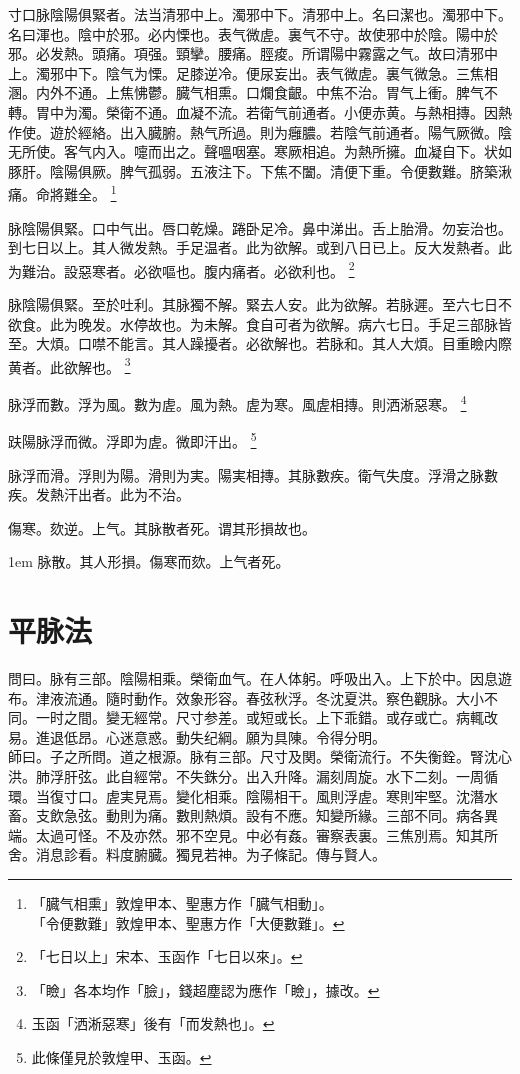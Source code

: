 寸口脉陰陽俱緊者。法当清邪中上。濁邪中下。清邪中上。名曰潔也。濁邪中下。名曰渾也。陰中於邪。必内慄也。表气微虗。裏气不守。故使邪中於陰。陽中於邪。必发熱。頭痛。項强。頸攣。腰痛。脛痠。所谓陽中霧露之气。故曰清邪中上。濁邪中下。陰气为慄。足膝逆冷。便尿妄出。表气微虗。裏气微急。三焦相溷。内外不通。上焦怫鬱。臓气相熏。口爛食齦。中焦不治。胃气上衝。脾气不轉。胃中为濁。榮衛不通。血凝不流。若衛气前通者。小便赤黄。与熱相摶。因熱作使。遊於經絡。出入臓腑。熱气所過。則为癰膿。若陰气前通者。陽气厥微。陰无所使。客气内入。嚏而出之。聲嗢咽塞。寒厥相追。为熱所擁。血凝自下。状如豚肝。陰陽俱厥。脾气孤弱。五液注下。下焦不闔。清便下重。令便數難。脐築湫痛。命將難全。
	\footnote{「臓气相熏」敦煌甲本、聖惠方作「臓气相動」。\\「令便數難」敦煌甲本、聖惠方作「大便數難」。}

脉陰陽俱緊。口中气出。唇口乾燥。踡卧足冷。鼻中涕出。舌上胎滑。勿妄治也。到七日以上。其人微发熱。手足温者。此为欲解。或到八日已上。反大发熱者。此为難治。設惡寒者。必欲嘔也。腹内痛者。必欲利也。
	\footnote{「七日以上」宋本、玉函作「七日以來」。}

脉陰陽俱緊。至於吐利。其脉獨不解。緊去人安。此为欲解。若脉遲。至六七日不欲食。此为晚发。水停故也。为未解。食自可者为欲解。病六七日。手足三部脉皆至。大煩。口噤不能言。其人躁擾者。必欲解也。若脉和。其人大煩。目重瞼内際黄者。此欲解也。
	\footnote{「瞼」各本均作「臉」，錢超塵認为應作「瞼」，據改。}

脉浮而數。浮为風。數为虗。風为熱。虗为寒。風虗相摶。則洒淅惡寒。
	\footnote{玉函「洒淅惡寒」後有「而发熱也」。}

趺陽脉浮而微。浮即为虗。微即汗出。
	\footnote{此條僅見於敦煌甲、玉函。}

脉浮而滑。浮{\khaaitp 則}为陽。滑{\khaaitp 則}为実。陽実相摶。其脉數疾。衛气失度。浮滑之脉數疾。发熱汗出者。此为不治。

傷寒。欬逆。上气。其脉散者死。谓其形損故也。

\hangindent 1em
脉散。其人形損。傷寒而欬。上气者死。

\chapter{平脉法}

問曰。脉有三部。陰陽相乘。榮衛血气。在人体躬。呼吸出入。上下於中。因息遊布。津液流通。隨时動作。效象形容。春弦秋浮。冬沈夏洪。察色觀脉。大小不同。一时之間。變无經常。尺寸参差。或短或长。上下乖錯。或存或亡。病輒改易。進退低昂。心迷意惑。動失纪綱。願为具陳。令得分明。\\
師曰。子之所問。道之根源。脉有三部。尺寸及関。榮衛流行。不失衡銓。腎沈心洪。肺浮肝弦。此自經常。不失銖分。出入升降。漏刻周旋。水下二刻。一周循環。当復寸口。虗実見焉。變化相乘。陰陽相干。風則浮虗。寒則牢堅。沈潛水畜。支飲急弦。動則为痛。數則熱煩。設有不應。知變所緣。三部不同。病各異端。太過可怪。不及亦然。邪不空見。中必有姦。審察表裏。三焦別焉。知其所舍。消息診看。料度腑臓。獨見若神。为子條記。傳与賢人。

